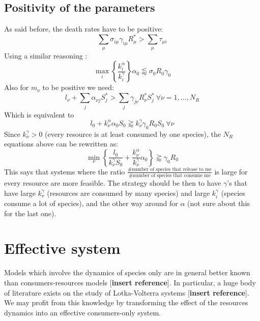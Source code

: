 \documentclass[12pt, titlepage]{report}
\begin{document}
\subsection{Positivity of the parameters}
As said before, the death rates have to be positive:
\begin{equation}
\sum_\mu \sigma_{i\mu}\gamma_{i\mu}R^*_\mu > \sum_\mu \tau_{\mu i}
\end{equation}
Using a similar reasoning :
\begin{equation}
\boxed{
\max_i\left\{\frac{k_i^\alpha}{k_i^\gamma}\right\} \alpha_0 \lessapprox \sigma_0R_0 \gamma_0
}
\end{equation}
Also for $m_\nu$ to be positive we need:
\begin{equation}
l_\nu + \sum_j \alpha_{\nu j} S^*_j > \sum_j \gamma_{j\nu}R^*_\nu S^*_j \ \forall \nu=1,\dots,N_R
\end{equation}
Which is equivalent to
\begin{equation}
l_0 + k_\nu^\alpha \alpha_0 S_0 \gtrapprox k_\nu^\gamma \gamma_0 R_0 S_0 \ \forall \nu
\end{equation}
Since $k_\nu^\gamma>0$ (every resource is at least consumed by one species), the $N_R$ equations above can be rewritten as:
\begin{equation}
\boxed{
\min_\nu\left\{\frac{l_0}{k_\nu^\gamma S_0} + \frac{k_\nu^\alpha}{k_\nu^\gamma}\alpha_0\right\} \gtrapprox \gamma_0 R_0
}
\end{equation}
This says that systems where the ratio $\frac{\#\text{number of species that release to me}}{\#\text{number of species that consume me}}$ is large for every resource are more feasible. The strategy should be then to have $\gamma$'s that have large $k^\gamma_\nu$ (\ie resources are consumed by many species) and large $k_i^\gamma$ (\ie species consume a lot of species), and the other way around for $\alpha$ (not sure about this for the last one).

\section{Effective system}
Models which involve the dynamics of species only are in general better known than consumers-resources models [\textbf{insert reference}]. In particular, a huge body of literature exists on the study of Lotka-Volterra systems [\textbf{insert reference}]. We may profit from this knowledge by transforming the effect of the resources dynamics into an effective consumers-only system.
\end{document}
